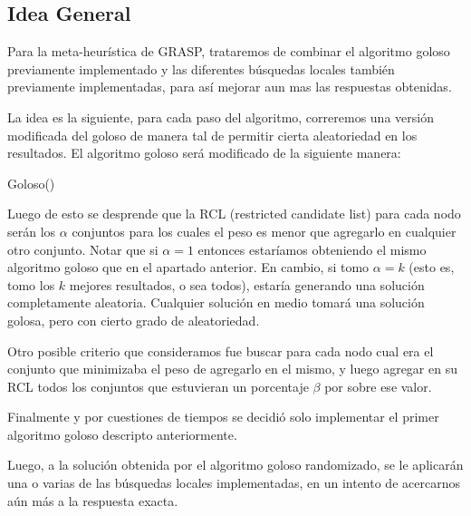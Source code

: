 \subsection{Idea General}

Para la meta-heurística de GRASP, trataremos de combinar el algoritmo goloso previamente implementado y las diferentes búsquedas locales también previamente implementadas, para así mejorar aun mas las respuestas obtenidas.

La idea es la siguiente, para cada paso del algoritmo, correremos una versión modificada del goloso de manera tal de permitir cierta aleatoriedad en los resultados. El algoritmo goloso será modificado de la siguiente manera:

\begin{algorithm}
  \begin{algorithmic}[1]\parskip=1mm
 \caption{ Goloso()}
\end{algorithmic}
\end{algorithm} 

Luego de esto se desprende que la RCL (restricted candidate list) para cada nodo serán los $\alpha$ conjuntos para los cuales el peso es menor que agregarlo en cualquier otro conjunto. Notar que si $\alpha=1$ entonces estaríamos obteniendo el mismo algoritmo goloso que en el apartado anterior. En cambio, si tomo $\alpha = k$ (esto es, tomo los $k$ mejores resultados, o sea todos), estaría generando una solución completamente aleatoria. Cualquier solución en medio tomará una solución golosa, pero con cierto grado de aleatoriedad.

Otro posible criterio que consideramos fue buscar para cada nodo cual era el conjunto que minimizaba el peso de agregarlo en el mismo, y luego agregar en su RCL todos los conjuntos que estuvieran un porcentaje $\beta$ por sobre ese valor.

Finalmente y por cuestiones de tiempos se decidió solo implementar el primer algoritmo goloso descripto anteriormente.

Luego, a la solución obtenida por el algoritmo goloso randomizado, se le aplicarán una o varias de las búsquedas locales implementadas, en un intento de acercarnos aún más a la respuesta exacta.

